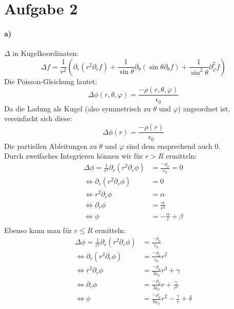 \documentclass{article}
\newcommand{\delr}{\partial_r}
\newcommand{\deltheta}{\partial_\theta}
\newcommand{\delphi}{\partial_\varphi}
\newcommand{\epsz}{\epsilon_0}
\begin{document}
\section*{Aufgabe 2}
\paragraph{a)}
$\Delta$ in Kugelkoordinaten:
\[
	\Delta f = \frac 1 {r^2}(
	\delr ( r^2 \delr f) +
	\frac 1 {\sin\theta} \deltheta (\sin\theta \deltheta f) +
	\frac 1 {\sin^2\theta} \delphi^2f)
\]
Die Poisson-Gleichung lautet:
\[
	\Delta \phi(r,\theta,\varphi) = \frac{-\rho(r,\theta,\varphi)}
	{\epsilon_0}
\]
Da die Ladung als Kugel (also symmetrisch zu $\theta$ und $\varphi$)
angeordnet ist, vereinfacht sich diese:
\[
	\Delta \phi(r) = \frac{-\rho(r)}{\epsilon_0}
\]
Die partiellen Ableitungen zu $\theta$ und $\varphi$ sind dem ensprechend
auch 0. \\
Durch zweifaches Integrieren können wir für $r > R$ ermitteln:
\begin{align*}
	\Delta \phi =
	\frac 1 {r^2} \delr \left(r^2 \delr \phi \right)
	&= \frac{- \rho_0}{\epsz} = 0\\
	\Leftrightarrow
	\delr \left( r^2 \delr \phi \right) &= 0 \\
	\Leftrightarrow
	r^2 \delr \phi  &= \alpha \\
	\Leftrightarrow
	\delr \phi  &= \frac{\alpha}{r^2} \\
	\Leftrightarrow
	\phi  &= -\frac{\alpha}{r} + \beta\\
\end{align*}
Ebenso kann man für $r \leq R$ ermitteln:
\begin{align*}
	\Delta \phi =
	\frac 1 {r^2} \delr \left(r^2 \delr \phi \right)
	&= \frac{- \rho_0}{\epsz} \\
	\Leftrightarrow
	\delr \left( r^2 \delr \phi \right)
	&= \frac{- \rho_0 }{\epsz} r^2  \\
	\Leftrightarrow
	r^2 \delr \phi
	&= \frac{- \rho_0 }{3  \epsz} r^3 + \gamma \\
	\Leftrightarrow
	\delr \phi
	&= \frac{- \rho_0 }{3  \epsz} r + \frac \gamma {r^2} \\
	\Leftrightarrow
	\phi
	&= \frac{- \rho_0 }{6  \epsz} r^2 - \frac \gamma r + \delta \\
\end{align*}
\end{document}
